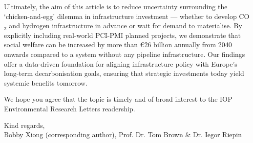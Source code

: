 \documentclass[10pt,a4paper,roman]{moderncv}        %
\begin{document}
Ultimately, the aim of this article is to reduce uncertainty surrounding the `chicken-and-egg' dilemma in infrastructure investment --- whether to develop CO$_2$ and hydrogen infrastructure in advance or wait for demand to materialise. By explicitly including real-world PCI-PMI planned projects, we demonstrate that social welfare can be increased by more than €26 billion annually from 2040 onwards compared to a system without any pipeline infrastructure. Our findings offer a data-driven foundation for aligning infrastructure policy with Europe's long-term decarbonisation goals, ensuring that strategic investments today yield systemic benefits tomorrow.

We hope you agree that the topic is timely and of broad interest to the IOP Environmental Research Letters readership.

Kind regards,\\
Bobby Xiong (corresponding author), Prof. Dr. Tom Brown \& Dr. Iegor Riepin

\clearpage


\end{document}
